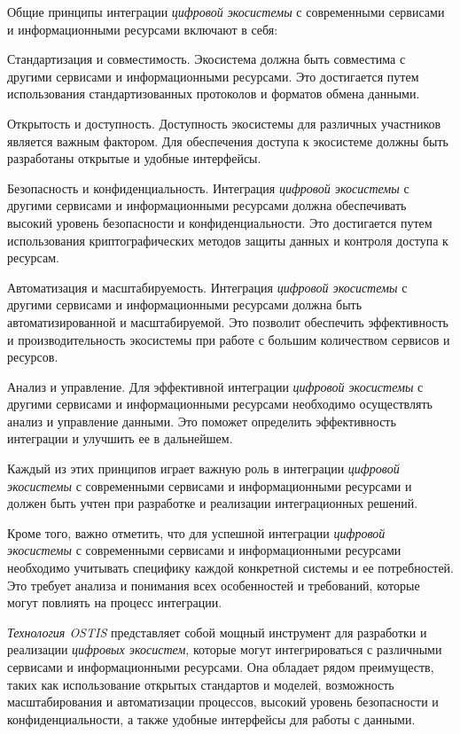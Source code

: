 Общие принципы интеграции \textit{цифровой экосистемы} с современными сервисами и информационными ресурсами включают в себя:
\begin{textitemize}
    \item Стандартизация и совместимость. Экосистема должна быть совместима с другими сервисами и информационными ресурсами. Это достигается путем использования стандартизованных протоколов и форматов обмена данными.
    \item Открытость и доступность. Доступность экосистемы для различных участников является важным фактором. Для обеспечения доступа к экосистеме должны быть разработаны открытые и удобные интерфейсы.
    \item Безопасность и конфиденциальность. Интеграция \textit{цифровой экосистемы} с другими сервисами и информационными ресурсами должна обеспечивать высокий уровень безопасности и конфиденциальности. Это достигается путем использования криптографических методов защиты данных и контроля доступа к ресурсам.
    \item Автоматизация и масштабируемость. Интеграция \textit{цифровой экосистемы} с другими сервисами и информационными ресурсами должна быть автоматизированной и масштабируемой. Это позволит обеспечить эффективность и производительность экосистемы при работе с большим количеством сервисов и ресурсов.
    \item Анализ и управление. Для эффективной интеграции \textit{цифровой экосистемы} с другими сервисами и информационными ресурсами необходимо осуществлять анализ и управление данными. Это поможет определить эффективность интеграции и улучшить ее в дальнейшем.
\end{textitemize}

Каждый из этих принципов играет важную роль в интеграции \textit{цифровой экосистемы} с современными сервисами и информационными ресурсами и должен быть учтен при разработке и реализации интеграционных решений.

Кроме того, важно отметить, что для успешной интеграции \textit{цифровой экосистемы} с современными сервисами и информационными ресурсами необходимо учитывать специфику каждой конкретной системы и ее потребностей. Это требует анализа и понимания всех особенностей и требований, которые могут повлиять на процесс интеграции.

\textit{Технология OSTIS} представляет собой мощный инструмент для разработки и реализации \textit{цифровых экосистем}, которые могут интегрироваться с различными сервисами и информационными ресурсами. Она обладает рядом преимуществ, таких как использование открытых стандартов и моделей, возможность масштабирования и автоматизации процессов, высокий уровень безопасности и конфиденциальности, а также удобные интерфейсы для работы с данными.

